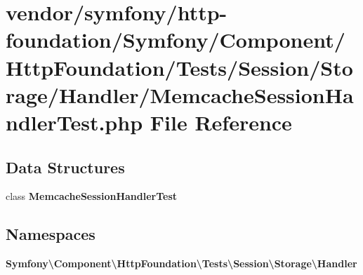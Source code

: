 \section{vendor/symfony/http-\/foundation/\+Symfony/\+Component/\+Http\+Foundation/\+Tests/\+Session/\+Storage/\+Handler/\+Memcache\+Session\+Handler\+Test.php File Reference}
\label{_memcache_session_handler_test_8php}
\subsection*{Data Structures}
\begin{DoxyCompactItemize}
\item 
class {\bf Memcache\+Session\+Handler\+Test}
\end{DoxyCompactItemize}
\subsection*{Namespaces}
\begin{DoxyCompactItemize}
\item 
 {\bf Symfony\textbackslash{}\+Component\textbackslash{}\+Http\+Foundation\textbackslash{}\+Tests\textbackslash{}\+Session\textbackslash{}\+Storage\textbackslash{}\+Handler}
\end{DoxyCompactItemize}
